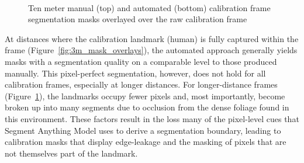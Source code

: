 \begin{figure}[htbp]
    \centering
    \\[1mm]
    \caption{Ten meter manual (top) and automated (bottom) calibration frame segmentation masks overlayed over
    the raw calibration frame}
    \label{fig:10m_mask_overlays}
\end{figure}

\clearpage

At distances where the calibration landmark (human) is fully captured within
the frame (Figure~\ref{fig:3m_mask_overlays}), the automated approach generally yields
masks with a segmentation quality on a comparable level to those produced manually.
This pixel-perfect segmentation, however, does not hold for all calibration frames,
especially at longer distances.
For longer-distance frames (Figure~\ref{fig:10m_mask_overlays}), the landmarks occupy
fewer pixels and, most importantly, become broken up into many segments due to occlusion
from the dense foliage found in this environment.
These factors result in the loss many of the pixel-level cues that Segment Anything Model
uses to derive a segmentation boundary, leading to calibration masks that display edge-leakage
and the masking of pixels that are not themselves part of the landmark.

